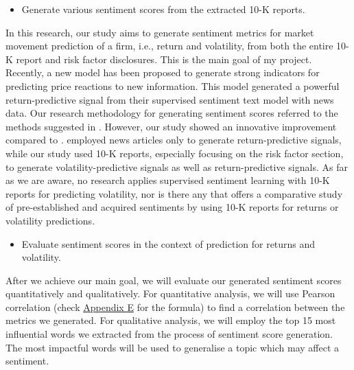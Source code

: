 \documentclass[logo,bsc,singlespacing,parskip]{infthesis}
\begin{document}
\begin{itemize}
    \item Generate various sentiment scores from the extracted 10-K reports.
\end{itemize}

In this research, our study aims to generate sentiment metrics for market movement prediction of a firm, i.e., return and volatility, from both the entire 10-K report and risk factor disclosures. This is the main goal of my project. Recently, a new model has been proposed to generate strong indicators for predicting price reactions to new information. This model \cite{ke2020predicting} generated a powerful return-predictive signal from their supervised sentiment text model with news data. Our research methodology for generating sentiment scores referred to the methods suggested in \cite{ke2020predicting}. However, our study showed an innovative improvement compared to \cite{ke2020predicting}.  \cite{ke2020predicting} employed news articles only to generate return-predictive signals, while our study used 10-K reports, especially focusing on the risk factor section, to generate volatility-predictive signals as well as return-predictive signals. As far as we are aware, no research applies supervised sentiment learning with 10-K reports for predicting volatility, nor is there any that offers a comparative study of pre-established and acquired sentiments by using 10-K reports for returns or volatility predictions.


\begin{itemize}
    \item Evaluate sentiment scores in the context of prediction for returns and volatility.
\end{itemize}
After we achieve our main goal, we will evaluate our generated sentiment scores quantitatively and qualitatively. For quantitative analysis, we will use Pearson correlation (check \hyperref[pearson-formula]{Appendix E} for the formula) to find a correlation between the metrics we generated. For qualitative analysis, we will employ the top 15 most influential words we extracted from the process of sentiment score generation. The most impactful words will be used to generalise a topic which may affect a sentiment. 
\end{document}
